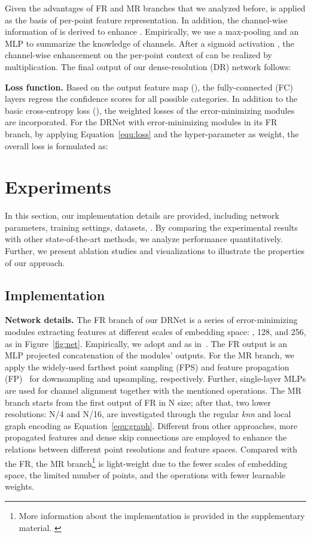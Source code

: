 \documentclass[10pt,twocolumn,letterpaper]{article}
\begin{document}
Given the advantages of FR and MR branches that we analyzed before,  is applied as the basis of per-point feature representation. In addition, the channel-wise information of  is derived to enhance . Empirically, we use a max-pooling and an MLP to summarize the knowledge of  channels. After a sigmoid activation , the channel-wise enhancement on the per-point context of  can be realized by multiplication. The final output of our dense-resolution (DR) network follows:


\noindent \textbf{Loss function.} Based on the output feature map (), the fully-connected (FC) layers regress the confidence scores for all possible categories. In addition to the basic cross-entropy loss (), the weighted losses of the error-minimizing modules are incorporated. For the DRNet with  error-minimizing modules in its FR branch, by applying Equation~\ref{equ:loss} and the hyper-parameter  as weight, the overall loss is formulated as:

\section{Experiments}
In this section, our implementation details are provided, including network parameters, training settings, datasets, \etc. By comparing the experimental results with other state-of-the-art methods, we analyze performance quantitatively. Further, we present ablation studies and visualizations to illustrate the properties of our approach.

\subsection{Implementation}
\label{sec:imple}
\noindent \textbf{Network details.}  The FR branch of our DRNet is a series of error-minimizing modules extracting features at different scales of embedding space: , 128, and 256, as in Figure~\ref{fig:net}. Empirically, we adopt  and  as in~\cite{wang2019dynamic, engelmann2019dilated}. The FR output  is an MLP projected concatenation of the modules' outputs. For the MR branch, we apply the widely-used farthest point sampling (FPS) and feature propagation (FP)~\cite{qi2017pointnet++, liu2019relation, Liu_2019_ICCV} for downsampling and upsampling, respectively. Further, single-layer MLPs are used for channel alignment together with the mentioned operations. The MR branch starts from the first output of FR in N size; after that, two lower resolutions: N/4 and N/16, are investigated through the regular \emph{knn} and local graph encoding as Equation~\ref{equ:graph}. Different from other approaches, more propagated features and dense skip connections are employed to enhance the relations between different point resolutions and feature spaces. Compared with the FR, the MR branch\footnote{More information about the implementation is provided in the supplementary material. \label{footnote}} is light-weight due to the fewer scales of embedding space, the limited number of points, and the operations with fewer learnable weights.
\end{document}

